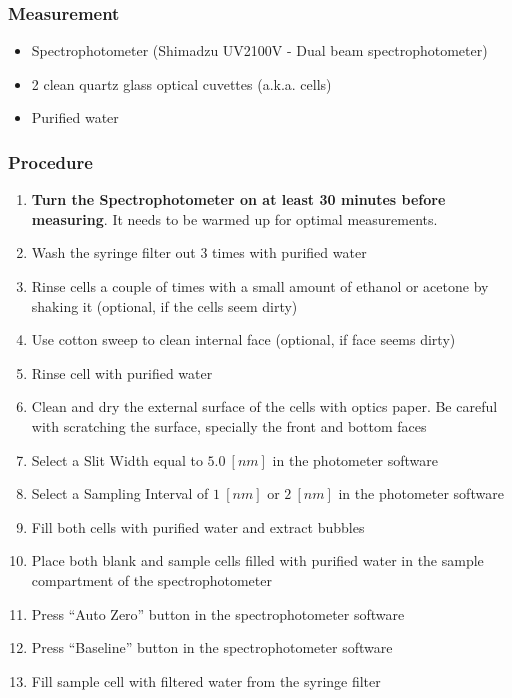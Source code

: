 \begin{appendices}
\subsubsection*{Measurement}
\begin{itemize}[itemsep=2pt,parsep=2pt]
  \item Spectrophotometer (Shimadzu UV2100V - Dual beam spectrophotometer)
  \item 2 clean quartz glass optical cuvettes (a.k.a. cells)
  \item Purified water
\end{itemize}
\subsubsection{Procedure}
\begin{enumerate}[itemsep=2pt,parsep=2pt]
  \item \textbf{Turn the Spectrophotometer on at least 30 minutes before measuring}. It needs to be warmed up for optimal measurements.
  \item Wash the syringe filter out 3 times with purified water
  \item Rinse cells a couple of times with a small amount of ethanol or acetone by shaking it (optional, if the cells seem dirty)
  \item Use cotton sweep to clean internal face (optional, if face seems dirty)
  \item Rinse cell with purified water
  \item Clean and dry the external surface of the cells with optics paper. Be careful with scratching the surface, specially the front and bottom faces
  \item Select a Slit Width equal to $5.0~[nm]$ in the photometer software
  \item Select a Sampling Interval of $1~[nm]$ or $2~[nm]$ in the photometer software
  \item Fill both cells with purified water and extract bubbles
  \item Place both blank and sample cells filled with purified water in the sample compartment of the spectrophotometer
  \item Press ``Auto Zero'' button in the spectrophotometer software
  \item Press ``Baseline'' button in the spectrophotometer software
  \item Fill sample cell with filtered water from the syringe filter

\end{enumerate}
\end{appendices}
